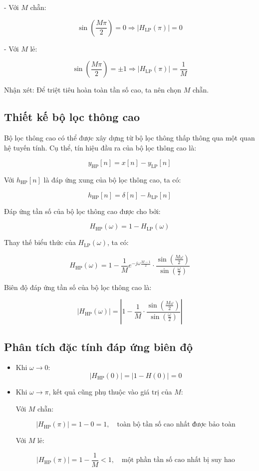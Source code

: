 - Với \( M \) chẵn:

\[
\sin\left(\frac{M\pi}{2}\right) = 0 \Rightarrow |H_{\mathrm{LP}}(\pi)| = 0
\]

- Với \( M \) lẻ:

\[
\sin\left(\frac{M\pi}{2}\right) = \pm 1 \Rightarrow |H_{\mathrm{LP}}(\pi)| = \frac{1}{M}
\]

Nhận xét: Để triệt tiêu hoàn toàn tần số cao, ta nên chọn \( M \) chẵn.

\subsection*{Thiết kế bộ lọc thông cao}

Bộ lọc thông cao có thể được xây dựng từ bộ lọc thông thấp thông qua một quan hệ tuyến tính. Cụ thể, tín hiệu đầu ra của bộ lọc thông cao là:

\[
y_{\mathrm{HP}}[n] = x[n] - y_{\mathrm{LP}}[n]
\]

Với \( h_{\mathrm{HP}}[n] \) là đáp ứng xung của bộ lọc thông cao, ta có:

\[
h_{\mathrm{HP}}[n] = \delta[n] - h_{\mathrm{LP}}[n]
\]

Đáp ứng tần số của bộ lọc thông cao được cho bởi:

\[
H_{\mathrm{HP}}(\omega) = 1 - H_{\mathrm{LP}}(\omega)
\]

Thay thế biểu thức của \( H_{\mathrm{LP}}(\omega) \), ta có:

\[
H_{\mathrm{HP}}(\omega) = 1 - \frac{1}{M} e^{-j \omega \frac{M-1}{2}} \cdot \frac{\sin\left(\frac{M \omega}{2}\right)}{\sin\left(\frac{\omega}{2}\right)}
\]

Biên độ đáp ứng tần số của bộ lọc thông cao là:

\[
|H_{\mathrm{HP}}(\omega)| = \left| 1 - \frac{1}{M} \cdot \frac{\sin\left( \frac{M \omega}{2} \right)}{\sin\left( \frac{\omega}{2} \right)} \right|
\]

\subsection*{Phân tích đặc tính đáp ứng biên độ}

\begin{itemize}
	\item Khi \( \omega \to 0 \):
	\[
	|H_{\mathrm{HP}}(0)| = |1 - H(0)| = 0
	\]
	
	\item Khi \( \omega \to \pi \), kết quả cũng phụ thuộc vào giá trị của \( M \):
	
	Với \( M \) chẵn:
	
	\[
	|H_{\mathrm{HP}}(\pi)| = 1 - 0 = 1, \quad \text{toàn bộ tần số cao nhất được bảo toàn}
	\]
	
	Với \( M \) lẻ:
	
	\[
	|H_{\mathrm{HP}}(\pi)| = 1 - \frac{1}{M} < 1, \quad \text{một phần tần số cao nhất bị suy hao}
	\]
\end{itemize}



